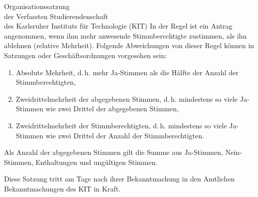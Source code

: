 \begin{jurdoc}[Organisationssatzung]{Organisationssatzung\\der Verfassten Studierendenschaft\\des Karlsruher Instituts für Technologie (KIT)}
In der Regel ist ein Antrag angenommen, wenn ihm mehr anwesende Stimmberechtigte zustimmen, als ihn ablehnen (relative Mehrheit). Folgende Abweichungen von dieser Regel können in Satzungen oder Geschäftsordnungen vorgesehen sein:
\begin{enumerate}
\item Absolute Mehrheit, d.\,h. mehr Ja-Stimmen als die Hälfte der Anzahl der Stimmberechtigten,
\item Zweidrittelmehrheit der abgegebenen Stimmen, d.\,h. mindestens so viele Ja-Stimmen wie zwei Drittel der abgegebenen Stimmen,
\item Zweidrittelmehrheit der Stimmberechtigten, d.\,h. mindestens so viele Ja-Stimmen wie zwei Drittel der Anzahl der Stimmberechtigten.
\end{enumerate}
Als Anzahl der abgegebenen Stimmen gilt die Summe aus Ja-Stimmen, Nein-Stimmen, Enthaltungen und ungültigen Stimmen.


\label{grundsaetze:inkrafttreten}
Diese Satzung tritt am Tage nach ihrer Bekanntmachung in den Amtlichen Bekanntmachungen des KIT in Kraft.


\end{jurdoc}
